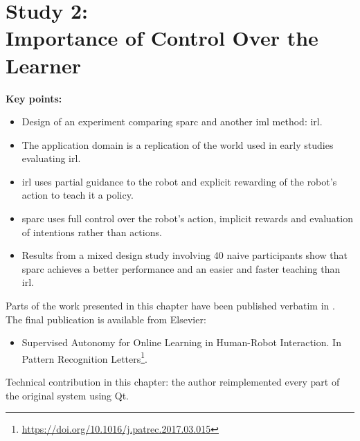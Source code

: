 \chapter[Study 2: Importance of Control Over the Learner]{Study 2: \\ Importance of Control Over the Learner}\label{chap:control}
\glsresetall
\graphicspath{{images/control/}}

\newcommand{\nosemic}{\SetEndCharOfAlgoLine{\relax}}%
\newcommand{\dosemic}{\SetEndCharOfAlgoLine{\string;}}%
\newcommand{\pushline}{\Indp}%
\newcommand{\popline}{\Indm\dosemic}%

\begin{framed}
	\textbf{Key points:}
	
	\begin{itemize}
		\item Design of an experiment comparing \acrshort{sparc} and another \acrlong{iml} method: \acrfull{irl}.
		\item The application domain is a replication of the world used in early studies evaluating \acrshort{irl}.
		\item \acrshort{irl} uses partial guidance to the robot and explicit rewarding of the robot's action to teach it a policy.
		\item \acrshort{sparc} uses full control over the robot's action, implicit rewards and evaluation of intentions rather than actions.
		\item Results from a mixed design study involving 40 naive participants show that \acrshort{sparc} achieves a better performance and an easier and faster teaching than \acrshort{irl}.
	\end{itemize}
\end{framed}

Parts of the work presented in this chapter have been published verbatim in \cite{senft2017supervised}. The final publication is available from Elsevier:
\begin{itemize}
	\item Supervised Autonomy for Online Learning in Human-Robot Interaction. In Pattern Recognition Letters\footnote{\url{https://doi.org/10.1016/j.patrec.2017.03.015}}.
\end{itemize} 

Technical contribution in this chapter: the author reimplemented every part of the original system using Qt.

